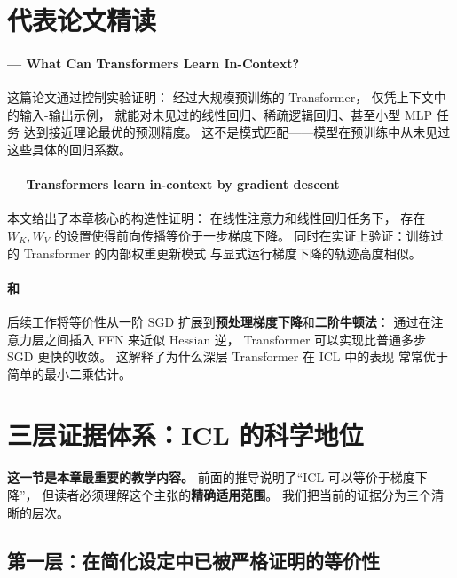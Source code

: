 \section{代表论文精读}
\label{sec:icl_papers}

\paragraph{\citet{garg2022what} — What Can Transformers Learn In-Context?}
这篇论文通过控制实验证明：
经过大规模预训练的 Transformer，
仅凭上下文中的输入-输出示例，
就能对未见过的线性回归、稀疏逻辑回归、甚至小型 MLP 任务
达到接近理论最优的预测精度。
这不是模式匹配——模型在预训练中从未见过这些具体的回归系数。

\paragraph{\citet{von2022transformers} — Transformers learn in-context by gradient descent}
本文给出了本章核心的构造性证明：
在线性注意力和线性回归任务下，
存在 $W_K, W_V$ 的设置使得前向传播等价于一步梯度下降。
同时在实证上验证：训练过的 Transformer 的内部权重更新模式
与显式运行梯度下降的轨迹高度相似。

\paragraph{\citet{ahn2023transformers} 和 \citet{zhang2023transformers}}
后续工作将等价性从一阶 SGD 扩展到\textbf{预处理梯度下降}和\textbf{二阶牛顿法}：
通过在注意力层之间插入 FFN 来近似 Hessian 逆，
Transformer 可以实现比普通多步 SGD 更快的收敛。
这解释了为什么深层 Transformer 在 ICL 中的表现
常常优于简单的最小二乘估计。

\section{三层证据体系：ICL 的科学地位}
\label{sec:icl_evidence}

\textbf{这一节是本章最重要的教学内容。}
前面的推导说明了``ICL 可以等价于梯度下降''，
但读者必须理解这个主张的\textbf{精确适用范围}。
我们把当前的证据分为三个清晰的层次。

\subsection*{第一层：在简化设定中已被严格证明的等价性}

